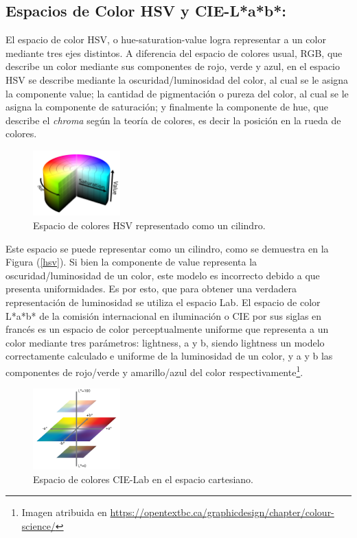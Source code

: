 \subsection{Espacios de Color HSV y CIE-L*a*b*:}
El espacio de color HSV, o hue-saturation-value logra representar a un color mediante tres ejes distintos. A diferencia del espacio de colores usual, RGB, que describe un color mediante sus componentes de rojo, verde y azul, en el espacio HSV se describe mediante la oscuridad/luminosidad del color, al cual se le asigna la componente value; la cantidad de pigmentación o pureza del color, al cual se le asigna la componente de saturación; y finalmente la componente de hue, que describe el \textit{chroma} según la teoría de colores, es decir la posición en la rueda de colores.

\begin{figure}[H]
		\centering
		\includegraphics[width=0.3\textwidth]{Imagenes/hsv.png}
		\caption{Espacio de colores HSV representado como un cilindro.}
		\label{fig:hsv}
\end{figure}

Este espacio se puede representar como un cilindro, como se demuestra en la Figura (\ref{hsv}). Si bien la componente de value representa la oscuridad/luminosidad de un color, este modelo es incorrecto debido a que presenta uniformidades. Es por esto, que para obtener una verdadera representación de luminosidad se utiliza el espacio Lab.
El espacio de color L*a*b* de la comisión internacional en iluminación o CIE por sus siglas en francés es un espacio de color perceptualmente uniforme que representa a un color mediante tres parámetros: lightness, a y b, siendo lightness un modelo correctamente calculado e uniforme de la luminosidad de un color, y a y b las componentes de rojo/verde y amarillo/azul del color respectivamente\footnote{Imagen atribuida en \href{https://opentextbc.ca/graphicdesign/chapter/colour-science/}{https:\slash \slash opentextbc.ca\slash graphicdesign\slash chapter\slash colour-science\slash}}.
\begin{figure}[H]
		\centering
		\includegraphics[width=0.3\textwidth]{Imagenes/lab.png}
		\caption{Espacio de colores CIE-Lab en el espacio cartesiano.}
		\label{fig:lab}
\end{figure}


